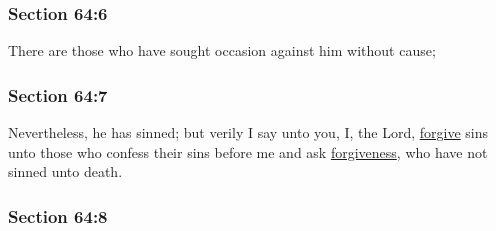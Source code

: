 
	\subsubsection{Section 64:6} %
		\label{DC64-6}

		There are those who have sought occasion against him without cause;


	\subsubsection{Section 64:7} %
		\label{DC64-7}

		Nevertheless, he has sinned; but verily I say unto you, I, the Lord, \hyperref[FORGIVENESS]{forgive} sins unto those who confess their sins before me and ask \hyperref[FORGIVENESS]{forgiveness}, who have not sinned unto death.


	\subsubsection{Section 64:8} %
		\label{DC64-8}

